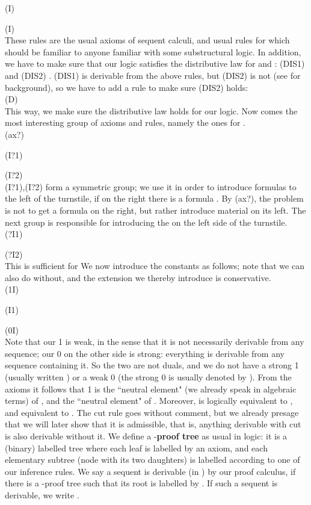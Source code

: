 \documentclass{eptcs}
\begin{document}
(I) 

(I) 
\\

These rules are the usual axioms of sequent calculi, and usual rules for
 which should be familiar to anyone familiar with some 
substructural logic. In addition, we have to make sure that our logic
satisfies the distributive law for  and : 
(DIS1) 
and
(DIS2) .
(DIS1) is derivable from
the above rules, but (DIS2) is not (see \cite{restall:introduction}
for background), so 
we have to add a rule to make sure (DIS2) holds:
\\

(D) 
\\

This way, we make sure the distributive law holds for our logic.
Now comes the most interesting group of axioms and rules, namely the ones for
. 
\\

(ax?) 

(I?1) 

(I?2) 
\\

(I?1),(I?2) form a symmetric group; we use 
it in order to introduce formulas to the
left of the turnstile, if on the right there is a formula . By 
(ax?), the problem is not to get a formula  
on the right, but rather introduce
material on its left. The next group is responsible for introducing
the  on the left side of the turnstile.
\\

(?I1) 

(?I2) 
\\

This is sufficient for 
We now introduce the constants  as follows; note that we can also do
without, and the extension we thereby introduce is conservative.
\\

(1I) 

(I1) 

(0I) 
\\

Note that our 1 is weak, in the sense that it is not necessarily
derivable from any sequence; our 0 on the other side is strong:
everything is derivable from any sequence containing it.
So the two are not duals, and we do not have a strong 1 (usually 
written )
or a weak 0 (the strong 0 is usually denoted by ).
From the axioms it follows that 1 is the ``neutral element" 
(we already speak in algebraic terms) of , and
 the ``neutral element" of . Moreover,  is logically
equivalent to
, and  equivalent to . The cut rule goes without comment,
but we already presage that we will later show that it is admissible,
that is, anything derivable with cut is also derivable without it.
We define a -\textbf{proof tree}
as usual in logic: it is a (binary) labelled tree where each leaf is
labelled by an axiom, and each elementary subtree (node with its
two daughters) is labelled according to one of our inference rules. 
We say a sequent  is derivable (in ) by our
proof calculus, if there is a -proof tree such that
its root is labelled by .
If such a sequent is derivable, 
we write . 
\end{document}
